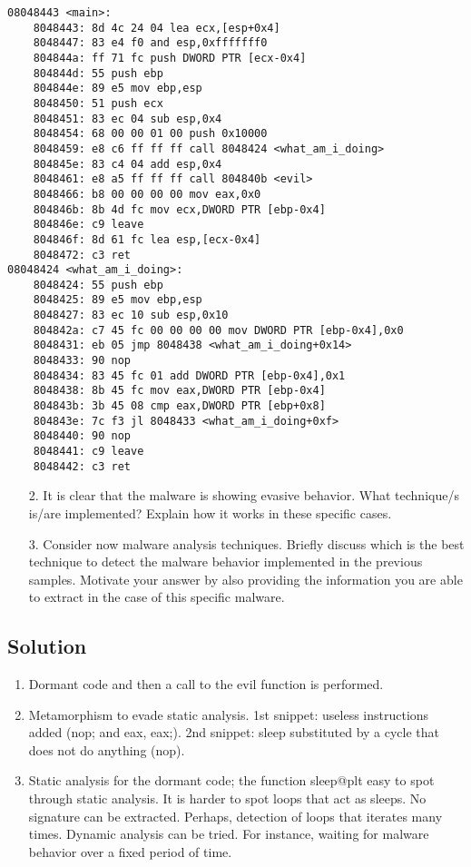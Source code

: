 \begin{verbatim}
08048443 <main>:
    8048443: 8d 4c 24 04 lea ecx,[esp+0x4]
    8048447: 83 e4 f0 and esp,0xfffffff0
    804844a: ff 71 fc push DWORD PTR [ecx-0x4]
    804844d: 55 push ebp
    804844e: 89 e5 mov ebp,esp
    8048450: 51 push ecx
    8048451: 83 ec 04 sub esp,0x4
    8048454: 68 00 00 01 00 push 0x10000
    8048459: e8 c6 ff ff ff call 8048424 <what_am_i_doing>
    804845e: 83 c4 04 add esp,0x4
    8048461: e8 a5 ff ff ff call 804840b <evil>
    8048466: b8 00 00 00 00 mov eax,0x0
    804846b: 8b 4d fc mov ecx,DWORD PTR [ebp-0x4]
    804846e: c9 leave
    804846f: 8d 61 fc lea esp,[ecx-0x4]
    8048472: c3 ret
08048424 <what_am_i_doing>:
    8048424: 55 push ebp
    8048425: 89 e5 mov ebp,esp
    8048427: 83 ec 10 sub esp,0x10
    804842a: c7 45 fc 00 00 00 00 mov DWORD PTR [ebp-0x4],0x0
    8048431: eb 05 jmp 8048438 <what_am_i_doing+0x14>
    8048433: 90 nop
    8048434: 83 45 fc 01 add DWORD PTR [ebp-0x4],0x1
    8048438: 8b 45 fc mov eax,DWORD PTR [ebp-0x4]
    804843b: 3b 45 08 cmp eax,DWORD PTR [ebp+0x8]
    804843e: 7c f3 jl 8048433 <what_am_i_doing+0xf>
    8048440: 90 nop
    8048441: c9 leave
    8048442: c3 ret
\end{verbatim}
\begin{enumerate}
    \item [2. ] It is clear that the malware is showing evasive behavior.
        What technique/s is/are implemented?
        Explain how it works in these specific cases. 
    \item [3. ] Consider now malware analysis techniques. 
        Briefly discuss which is the best technique to detect the malware behavior implemented in the previous samples. 
        Motivate your answer by also providing the information you are able to extract in the case of this specific malware.
\end{enumerate}

\subsection*{Solution}
\begin{enumerate}
    \item Dormant code and then a call to the evil function is performed. 
    \item Metamorphism to evade static analysis.
        1st snippet: useless instructions added (nop; and eax, eax;).
        2nd snippet: sleep substituted by a cycle that does not do anything (nop).
    \item Static analysis for the dormant code; the function sleep@plt easy to spot through static analysis.
        It is harder to spot loops that act as sleeps. 
        No signature can be extracted. 
        Perhaps, detection of loops that iterates many times.
        Dynamic analysis can be tried. 
        For instance, waiting for malware behavior over a fixed period of time.
\end{enumerate}